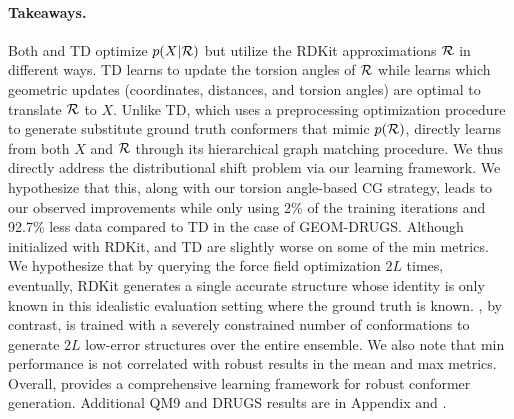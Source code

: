 \vspace{-1ex}
\paragraph{Takeaways.}
Both \model and TD optimize $p(X|{\mathcal{R}})$ but utilize the RDKit approximations ${\mathcal{R}}$ in different ways. TD learns to update the torsion angles of ${\mathcal{R}}$ while \model learns which geometric updates (coordinates, distances, and torsion angles) are optimal to translate ${\mathcal{R}}$ to $X$.
Unlike TD, which uses a preprocessing optimization procedure to generate substitute ground truth conformers that mimic $p({\mathcal{R}})$, 
\model directly learns from both $X$ and ${\mathcal{R}}$ through its hierarchical graph matching procedure. We thus directly address the distributional shift problem via our learning framework.
We hypothesize that this, along with our torsion angle-based CG strategy, leads to our observed improvements while only using 2\% of the training iterations and 92.7\% less data compared to TD in the case of GEOM-DRUGS.
Although initialized with RDKit, \model and TD are slightly worse on some of the min metrics. We hypothesize that by querying the force field optimization $2L$ times, eventually, RDKit generates a single accurate structure whose identity is only known in this idealistic evaluation setting where the ground truth is known. 
\modelns, by contrast, is trained with a severely constrained number of conformations to generate $2L$ low-error structures over the entire ensemble.
We also note that min performance is not correlated with robust results in the mean and max metrics.
Overall, \model provides a comprehensive learning framework for robust conformer generation. 
Additional QM9 and DRUGS results are in Appendix  and .
\vspace{-2ex}